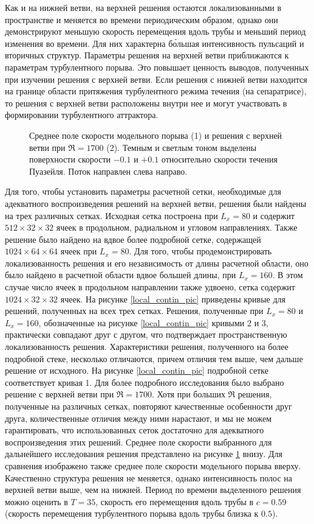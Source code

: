 Как и на нижней ветви, на верхней решения остаются локализованными в пространстве и меняется во времени периодическим образом, однако они демонстрируют меньшую скорость перемещения вдоль трубы и меньший период изменения во времени. Для них характерна б\'{о}льшая интенсивность пульсаций и вторичных структур. Параметры решения на верхней ветви приближаются к параметрам турбулентного порыва. Это повышает ценность выводов, полученных при изучении решения  с верхней ветви. Если решения с нижней ветви находится на границе области притяжения турбулентного режима течения (на сепаратрисе), то решения с верхней ветви расположены внутри нее и могут участвовать в формировании турбулентного аттрактора\cite{Avila2013}. 

\begin{figure}
\caption{Среднее поле скорости модельного порыва (1) и решения с верхней ветви при $\Re = 1700$ (2). Темным и светлым тоном выделены поверхности скорости $-0.1$ и $+0.1$ относительно скорости течения Пуазейля. Поток направлен слева направо.}
\label{3D_contin_cmp_pic}
\end{figure}

Для того, чтобы установить параметры расчетной сетки, необходимые для адекватного воспроизведения решений на верхней ветви, решения были найдены на трех различных сетках. Исходная сетка построена при $L_x = 80$ и содержит $512 \times 32 \times 32$ ячеек в продольном, радиальном и угловом направлениях. Также решение было найдено на вдвое более подробной сетке, содержащей $1024 \times 64 \times 64$ ячеек при $L_x = 80$. Для того, чтобы продемонстрировать локализованность решения и его независимость от длины расчетной области, оно было найдено в расчетной области вдвое большей длины, при $L_x = 160$. В этом случае число ячеек в продольном направлении также удвоено, сетка содержит $1024 \times 32 \times 32$ ячеек. На рисунке \ref{local_contin_pic} приведены кривые для решений, полученных на всех трех сетках. Решения, полученные при $L_x = 80$ и $L_x = 160$, обозначенные на рисунке \ref{local_contin_pic} кривыми 2 и 3, практически совпадают друг с другом, что подтверждает пространственную локализованность решения. Характеристики решения, полученного на более подробной стеке, несколько отличаются, причем отличия тем выше, чем дальше решение от исходного. На рисунке \ref{local_contin_pic} подробной сетке соответствует кривая 1. Для более подробного исследования было выбрано решение с верхней ветви при $\Re = 1700$. Хотя при больших $\Re$ решения, полученные на различных сетках, повторяют качественные особенности друг друга, количественные отличия между ними нарастают, и мы не можем гарантировать, что использованных сеток достаточно для адекватного воспроизведения этих решений. Среднее поле скорости выбранного для дальнейшего исследования решения представлено на рисунке \ref{3D_contin_cmp_pic} внизу. Для сравнения изображено также среднее поле скорости модельного порыва вверху. Качественно структура решения не меняется, однако интенсивность полос на верхней ветви выше, чем на нижней. Период по времени выделенного решения можно оценить в $T = 35$, скорость его перемещения вдоль трубы в $c = 0.59$ (скорость перемещения турбулентного порыва вдоль трубы близка к $0.5$). 

